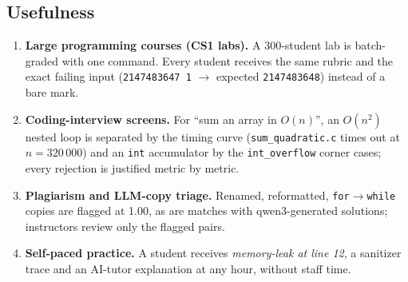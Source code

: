 \documentclass[11pt,a4paper]{article}
\newcommand{\file}[1]{\nolinkurl{#1}}
\begin{document}
\subsection{Usefulness}
\begin{enumerate}
  \item \textbf{Large programming courses (CS1 labs).} A 300-student lab is batch-graded with one command. Every student
        receives the same rubric and the exact failing input (\texttt{2147483647 1} $\rightarrow$ expected \texttt{2147483648})
        instead of a bare mark.
  \item \textbf{Coding-interview screens.} For ``sum an array in $O(n)$'', an $O(n^2)$ nested loop is separated by the timing
        curve (\file{sum_quadratic.c} times out at $n = 320\,000$) and an \texttt{int} accumulator by the
        \texttt{int\_overflow} corner cases; every rejection is justified metric by metric.
  \item \textbf{Plagiarism and LLM-copy triage.} Renamed, reformatted, \texttt{for}$\rightarrow$\texttt{while} copies are flagged at
        1.00, as are matches with qwen3-generated solutions; instructors review only the flagged pairs.
  \item \textbf{Self-paced practice.} A student receives \emph{memory-leak at line 12}, a sanitizer trace and an AI-tutor
        explanation at any hour, without staff time.
\end{enumerate}
\end{document}
